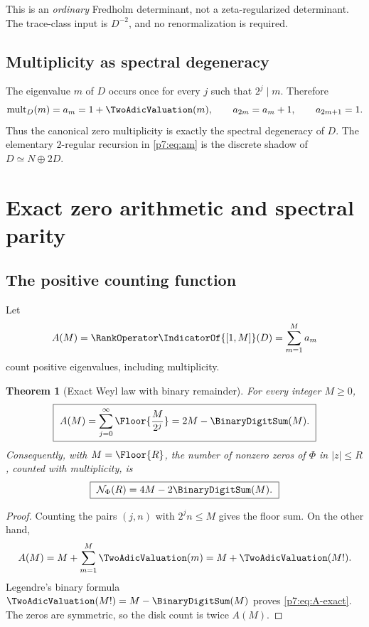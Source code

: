 \documentclass[11pt]{article}
\numberwithin{equation}{section}
\newtheorem{theorem}{Theorem}[section]
\theoremstyle{definition}
\theoremstyle{remark}
\begin{document}
\begin{remark}
This is an \emph{ordinary} Fredholm determinant, not a zeta-regularized determinant.  The trace-class input is $D^{-2}$, and no renormalization is required.
\end{remark}

\subsection{Multiplicity as spectral degeneracy}

The eigenvalue $m$ of $D$ occurs once for every $j$ such that $2^j\mid m$.  Therefore
\begin{equation}\label{p7:eq:am}
 \operatorname{mult}_D(m)=a_m=1+\TwoAdicValuation(m),
 \qquad
 a_{2m}=a_m+1,
 \qquad
 a_{2m+1}=1.
\end{equation}
Thus the canonical zero multiplicity is exactly the spectral degeneracy of $D$.  The elementary $2$-regular recursion in \cref{p7:eq:am} is the discrete shadow of $D\simeq N\oplus2D$.

\section{Exact zero arithmetic and spectral parity}

\subsection{The positive counting function}

Let
\[
 A(M)=\RankOperator\IndicatorOf{[1,M]}(D)
 =\sum_{m=1}^{M}a_m
\]
count positive eigenvalues, including multiplicity.

\begin{theorem}[Exact Weyl law with binary remainder]\label{p7:thm:counting}
For every integer $M\ge0$,
\begin{equation}\label{p7:eq:A-exact}
 \boxed{\ A(M)=\sum_{j=0}^{\infty}\Floor{\frac{M}{2^j}}
 =2M-\BinaryDigitSum(M).\ }
\end{equation}
Consequently, with $M=\Floor{R}$, the number of nonzero zeros of $\Phi$ in $|z|\le R$, counted with multiplicity, is
\begin{equation}\label{p7:eq:Nphi}
 \boxed{\ \mathcal N_\Phi(R)=4M-2\BinaryDigitSum(M).\ }
\end{equation}
\end{theorem}

\begin{proof}
Counting the pairs $(j,n)$ with $2^jn\le M$ gives the floor sum.  On the other hand,
\[
 A(M)=M+\sum_{m=1}^{M}\TwoAdicValuation(m)
 =M+\TwoAdicValuation(M!).
\]
Legendre's binary formula $\TwoAdicValuation(M!)=M-\BinaryDigitSum(M)$ proves \cref{p7:eq:A-exact}.  The zeros are symmetric, so the disk count is twice $A(M)$.
\end{proof}
\end{document}
